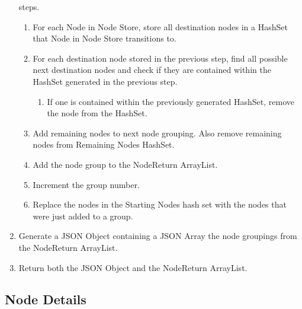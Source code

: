 \begin{enumerate}
   steps.
   \begin{enumerate}
     \item For each Node in Node Store, store all destination nodes in a HashSet
     that Node in Node Store transitions to.
     \item For each destination node stored in the previous step, find all
     possible next destination nodes and check if they are contained within the
     HashSet generated in the previous step.
     \begin{enumerate}
       \item If one is contained within the previously generated HashSet, remove
       the node from the HashSet.
     \end{enumerate}
     \item Add remaining nodes to next node grouping.  Also remove remaining
     nodes from Remaining Nodes HashSet.
     \item Add the node group to the NodeReturn ArrayList.
     \item Increment the group number.
     \item Replace the nodes in the Starting Nodes hash set with the nodes that
     were just added to a group.
   \end{enumerate} 
   \item Generate a JSON Object containing a JSON Array the node groupings from
   the NodeReturn ArrayList.
   \item Return both the JSON Object and the NodeReturn ArrayList.
 \end{enumerate}



\subsection{Node Details}

\usetikzlibrary{shapes,arrows,chains}

